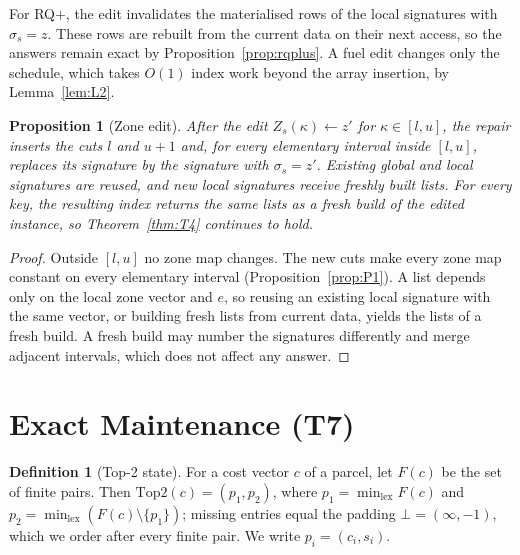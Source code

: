 \documentclass[11pt]{article}
\newtheorem{proposition}[theorem]{Proposition}
\theoremstyle{definition}
\newtheorem{definition}[theorem]{Definition}
\theoremstyle{remark}
\begin{document}
For RQ+, the edit invalidates the materialised rows of the local signatures with
$\sigma_s=z$. These rows are rebuilt from the current data on their next access, so the
answers remain exact by Proposition~\ref{prop:rqplus}. A fuel edit changes only the
schedule, which takes $O(1)$ index work beyond the array insertion, by Lemma~\ref{lem:L2}.

\begin{proposition}[Zone edit]\label{prop:zoneedit}
After the edit $Z_s(\kappa)\leftarrow z'$ for $\kappa\in[l,u]$, the repair inserts the cuts $l$
and $u+1$ and, for every elementary interval inside $[l,u]$, replaces its signature by the
signature with $\sigma_s=z'$. Existing global and local signatures are reused, and new local
signatures receive freshly built lists. For every key, the resulting index returns the
same lists as a fresh build of the edited instance, so Theorem~\ref{thm:T4} continues to
hold.
\end{proposition}
\begin{proof}
Outside $[l,u]$ no zone map changes. The new cuts make every zone map constant on every
elementary interval (Proposition~\ref{prop:P1}). A list depends only on the local zone vector
and $e$, so reusing an existing local signature with the same vector, or building fresh
lists from current data, yields the lists of a fresh build. A fresh build may number the
signatures differently and merge adjacent intervals, which does not affect any answer.
\end{proof}

\section{Exact Maintenance (T7)}\label{sec:T7}

\begin{definition}[Top-2 state]\label{def:top2}
For a cost vector $c$ of a parcel, let $F(c)$ be the set of finite pairs. Then
$\mathrm{Top2}(c)=(p_1,p_2)$, where $p_1=\min_{\mathrm{lex}}F(c)$ and
$p_2=\min_{\mathrm{lex}}(F(c)\setminus\{p_1\})$; missing entries equal the padding
$\bot=(\infty,-1)$, which we order after every finite pair. We write $p_i=(c_i,s_i)$.
\end{definition}
\end{document}
